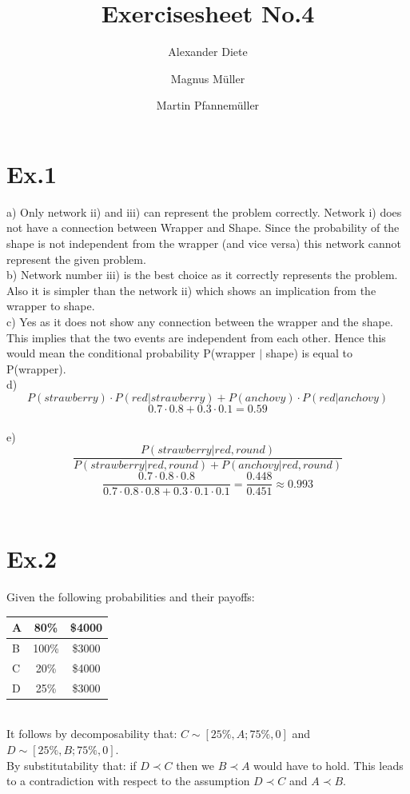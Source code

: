 \documentclass[11pt]{article}
\title{Exercisesheet No.4}
\author{Alexander Diete \and Magnus M\"uller \and Martin Pfannem\"uller}
\begin{document}
\maketitle

\section*{Ex.1}
a) Only network ii) and iii) can represent the problem correctly. Network i) does not have a connection between Wrapper and Shape. Since the probability of the shape is not independent from the wrapper (and vice versa) this network cannot represent the given problem. \\

b) Network number iii) is the best choice as it correctly represents the problem. Also it is simpler than the network ii) which shows an implication from the wrapper to shape. \\

c) Yes as it does not show any connection between the wrapper and the shape. This implies that the two events are independent from each other. Hence this would mean the conditional probability P(wrapper $|$ shape) is equal to P(wrapper). \\

d) 
$$P(strawberry) \cdot P(red|strawberry) + P(anchovy) \cdot P(red|anchovy)$$
$$0.7 \cdot 0.8 + 0.3 \cdot 0.1 = 0.59$$ \\

e)
$$\frac{P(strawberry | red, round)}{P(strawberry | red, round) + P(anchovy | red, round)}$$
$$\frac{0.7 \cdot 0.8 \cdot 0.8}{0.7 \cdot 0.8 \cdot 0.8 + 0.3 \cdot 0.1 \cdot 0.1} = \frac{0.448}{0.451} \approx 0.993$$ \\

\section*{Ex.2}
Given the following probabilities and their payoffs:\\
\begin{tabular}{|l|c|c|}
\hline
    A & 80\% & \$4000 \\
    \hline
    B & 100\% & \$3000 \\
    \hline
    C & 20\% & \$4000 \\
    \hline
    D & 25\% & \$3000 \\
    \hline
\end{tabular}
\\
It follows by decomposability that: $C\sim[25\%,A; 75\%,0]$ and $D\sim[25\%,B;75\%,0]$. \\
By substitutability that: if $D \prec C$ then we $B \prec A$ would have to hold. This leads to a contradiction with respect to the assumption $D \prec C$ and $A \prec B$.
\end{document}
